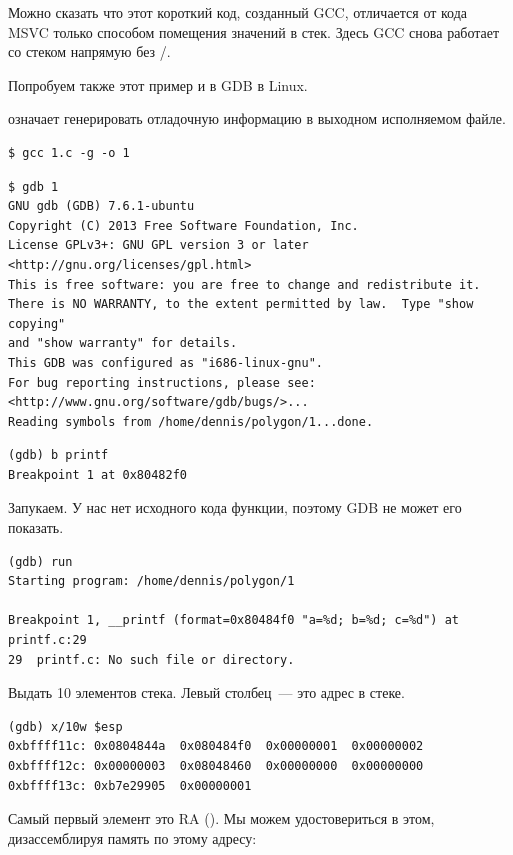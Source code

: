 Можно сказать что этот короткий код, созданный GCC, отличается от кода MSVC только способом помещения 
значений в стек.
Здесь GCC снова работает со стеком напрямую без \PUSH/\POP.


Попробуем также этот пример и в \ac{GDB} в Linux.

 означает генерировать отладочную информацию в выходном исполняемом файле.

\begin{lstlisting}
$ gcc 1.c -g -o 1
\end{lstlisting}

\begin{lstlisting}
$ gdb 1
GNU gdb (GDB) 7.6.1-ubuntu
Copyright (C) 2013 Free Software Foundation, Inc.
License GPLv3+: GNU GPL version 3 or later <http://gnu.org/licenses/gpl.html>
This is free software: you are free to change and redistribute it.
There is NO WARRANTY, to the extent permitted by law.  Type "show copying"
and "show warranty" for details.
This GDB was configured as "i686-linux-gnu".
For bug reporting instructions, please see:
<http://www.gnu.org/software/gdb/bugs/>...
Reading symbols from /home/dennis/polygon/1...done.
\end{lstlisting}

\begin{lstlisting}[caption=установим точку останова на \printf]
(gdb) b printf
Breakpoint 1 at 0x80482f0
\end{lstlisting}

Запукаем.
У нас нет исходного кода функции, поэтому \ac{GDB} не может его показать.

\begin{lstlisting}
(gdb) run
Starting program: /home/dennis/polygon/1 

Breakpoint 1, __printf (format=0x80484f0 "a=%d; b=%d; c=%d") at printf.c:29
29	printf.c: No such file or directory.
\end{lstlisting}

Выдать 10 элементов стека. Левый столбец~--- это адрес в стеке.

\begin{lstlisting}
(gdb) x/10w $esp
0xbffff11c:	0x0804844a	0x080484f0	0x00000001	0x00000002
0xbffff12c:	0x00000003	0x08048460	0x00000000	0x00000000
0xbffff13c:	0xb7e29905	0x00000001
\end{lstlisting}

Самый первый элемент это \ac{RA} ().
Мы можем удостовериться в этом, дизассемблируя память по этому адресу:

